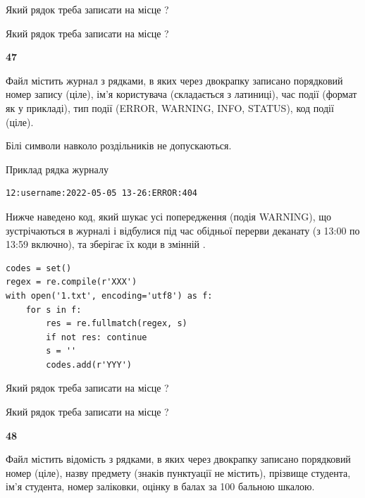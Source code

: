 Який рядок треба записати на місце  ?\par
\vspace{5mm}


Який рядок треба записати на місце  ?\par


\newpage

{\begin {center}\textbf{ 47}\end {center}}\par
Файл  містить журнал з рядками, в яких через двокрапку записано поряд\-ко\-вий номер запису (ціле), ім'я користувача (складається з латиниці), час події (фор\-мат як у прикладі), тип події (ERROR, WARNING, INFO, STATUS), код події (ціле).

Білі символи навколо роздільників не допускаються.

Приклад рядка журналу



\begin{verbatim}
12:username:2022-05-05 13-26:ERROR:404
\end{verbatim}


Нижче наведено код, який шукає усі попередження (подія WARNING), що зустрі\-ча\-ються в журналі і відбулися під час обідньої перерви деканату (з 13:00 по 13:59 включно), та зберігає їх коди в змінній .



\begin{verbatim}
codes = set()
regex = re.compile(r'XXX')
with open('1.txt', encoding='utf8') as f:
    for s in f:
        res = re.fullmatch(regex, s)
        if not res: continue
        s = ''
        codes.add(r'YYY')
\end{verbatim}







Який рядок треба записати на місце  ?\par
\vspace{5mm}


Який рядок треба записати на місце  ?\par


\newpage

{\begin {center}\textbf{ 48}\end {center}}\par
Файл  містить відомість з рядками, в яких через двокрапку записано поряд\-ковий номер (ціле), назву предмету (знаків пунктуації не містить), прізвище студента, ім'я студента, номер заліковки, оцінку в балах за 100 бальною шкалою.

